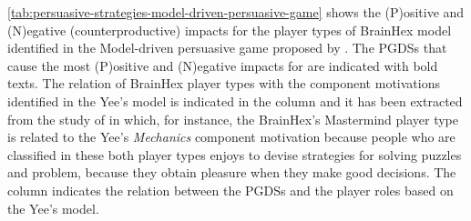 \autoref{tab:persuasive-strategies-model-driven-persuasive-game} shows the (P)ositive and (N)egative  (counterproductive) impacts for the player types of BrainHex model identified in the Model-driven persuasive game proposed by . The PGDSs that cause the most (P)ositive and (N)egative impacts for  are indicated with bold texts. The relation of BrainHex player types with the component motivations identified in the Yee's model is indicated in the column  and it has been extracted from the study of  in which, for instance, the BrainHex's Mastermind player type is related to the Yee's \emph{Mechanics} component motivation because people who are classified in these both player types enjoys to devise strategies for solving puzzles and problem, because they obtain pleasure when they make good decisions. The column  indicates the relation between the PGDSs and the player roles based on the Yee's model.

